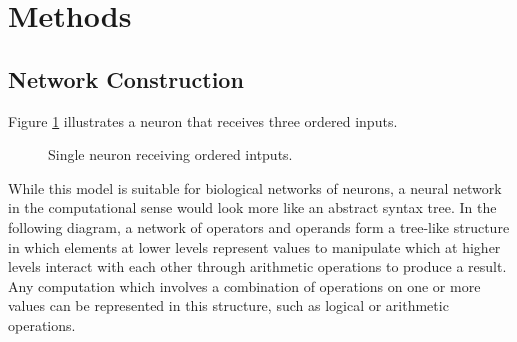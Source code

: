 \documentclass{article}
\begin{document}
	\section{Methods}
	
	\subsection{Network Construction}
	
	Figure \ref{fig:sig-neuron} illustrates a neuron that receives three ordered inputs. 
	
	
	\begin{figure}[!htb]
		
		\centering
		\caption{Single neuron receiving ordered intputs. \label{fig:sig-neuron}}
	\end{figure}
	
	
	While this model is suitable for biological networks of neurons, a neural network in the computational sense would look more like an abstract syntax tree. In the following diagram, a network of operators and operands form a tree-like structure in which elements at lower levels represent values to manipulate which at higher levels interact with each other through arithmetic operations to produce a result. Any computation which involves a combination of operations on one or more values can be represented in this structure, such as logical or arithmetic operations.
	
\end{document}
